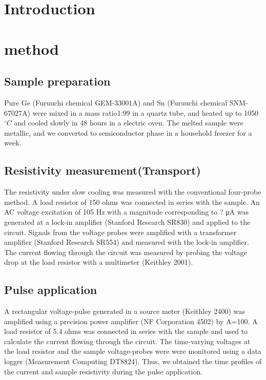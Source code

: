 \documentclass[aip,apl,reprint]{revtex4-1}
\begin{document}
\section{Introduction}




\section{method}
\subsection{Sample preparation}
Pure Ge (Furuuchi chemical GEM-33001A) and Sn (Furuuchi chemical SNM-67027A) were mixed in a mass ratio1:99 in a quartz tube, and heated up to 1050$^\circ C$  and cooled slowly in 48 hours in a electric oven. The melted sample were metallic, and we converted to semiconductor phase in a household freezer for a week. 

\subsection{Resistivity measurement(Transport)}
The resistivity under slow cooling was measured with the conventional four-probe method. A load resistor of 150 ohms was connected in series with the sample. An AC voltage excitation of 105 Hz with a magnitude corresponding to ? μA was generated at a lock-in amplifier (Stanford Research SR830) and applied to the circuit. Signals from the voltage probes were amplified with a transformer amplifier (Stanford Research SR554) and measured with the lock-in amplifier. The current flowing through the circuit was measured by probing the voltage drop at the load resistor with a multimeter (Keithley 2001).

\subsection{Pulse application}
A rectangular voltage-pulse generated in a source meter (Keithley 2400) was amplified using a precision power amplifier (NF Corporation 4502) by A=100. A load resistor of 5.4 ohms was connected in series with the sample and used to calculate the current flowing through the circuit. The time-varying voltages at the load resistor and the sample voltage-probes were were monitored using a data logger (Measurement Computing DT8824). Thus, we obtained the time profiles of the current and sample resistivity during the pulse application. 
\end{document}
